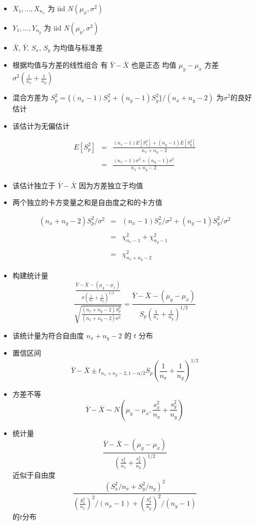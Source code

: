 \documentclass[
]{book}
\begin{document}
\begin{itemize}
\item
  \(X_1,\ldots,X_{n_x}\) 为 iid \(N(\mu_x,\sigma^2)\)
\item
  \(Y_1,\ldots,Y_{n_y}\) 为 iid \(N(\mu_y, \sigma^2)\)
\item
  \(\bar X\), \(\bar Y\), \(S_x\), \(S_y\) 为均值与标准差
\item
  根据均值与方差的线性组合 有 \(\bar Y - \bar X\) 也是正态 均值 \(\mu_y - \mu_x\) 方差 \(\sigma^2 (\frac{1}{n_x} + \frac{1}{n_y})\)
\item
  混合方差为 \(S_p^2 = \{(n_x - 1) S_x^2 + (n_y - 1) S_y^2\}/(n_x + n_y - 2)\) 为\(\sigma^2\)的良好估计
\item
  该估计为无偏估计

  \begin{eqnarray*}
    E[S_p^2] & = & \frac{(n_x - 1) E[S_x^2] + (n_y - 1) E[S_y^2]}{n_x + n_y - 2}\\
            & = & \frac{(n_x - 1)\sigma^2 + (n_y - 1)\sigma^2}{n_x + n_y - 2}
    \end{eqnarray*}
\item
  该估计独立于 \(\bar Y - \bar X\) 因为方差独立于均值
\item
  两个独立的卡方变量之和是自由度之和的卡方值

  \begin{eqnarray*}
      (n_x + n_y - 2) S_p^2 / \sigma^2 & = & (n_x - 1)S_x^2 /\sigma^2 + (n_y - 1)S_y^2/\sigma^2 \\ \\
      & = & \chi^2_{n_x - 1} + \chi^2_{n_y-1} \\ \\
      & = & \chi^2_{n_x + n_y - 2}
    \end{eqnarray*}
\item
  构建统计量
  \[
    \frac{\frac{\bar Y - \bar X - (\mu_y - \mu_x)}{\sigma \left(\frac{1}{n_x} + \frac{1}{n_y}\right)^{1/2}}}{\sqrt{\frac{(n_x + n_y - 2) S_p^2}{(n_x + n_y - 2)\sigma^2}}}
    = \frac{\bar Y - \bar X - (\mu_y - \mu_x)}{S_p \left(\frac{1}{n_x} + \frac{1}{n_y}\right)^{1/2}}
  \]
\item
  该统计量为符合自由度 \(n_x + n_y - 2\) 的 \(t\) 分布
\item
  置信区间
  \[
    \bar Y - \bar X \pm t_{n_x + n_y - 2, 1 - \alpha/2}S_p\left(\frac{1}{n_x} + \frac{1}{n_y}\right)^{1/2}
  \]
\item
  方差不等
  \[
    \bar Y - \bar X \sim N\left(\mu_y - \mu_x, \frac{s_x^2}{n_x} + \frac{s_y^2}{n_y}\right)
  \]
\item
  统计量
  \[
    \frac{\bar Y - \bar X - (\mu_y - \mu_x)}{\left(\frac{s_x^2}{n_x} + \frac{s_y^2}{n_y}\right)^{1/2}}
  \]
  近似于自由度
  \[
    \frac{\left(S_x^2 / n_x + S_y^2/n_y\right)^2}
    {\left(\frac{S_x^2}{n_x}\right)^2 / (n_x - 1) +
      \left(\frac{S_y^2}{n_y}\right)^2 / (n_y - 1)}
  \]
  的\(t\)分布
\end{itemize}
\end{document}
